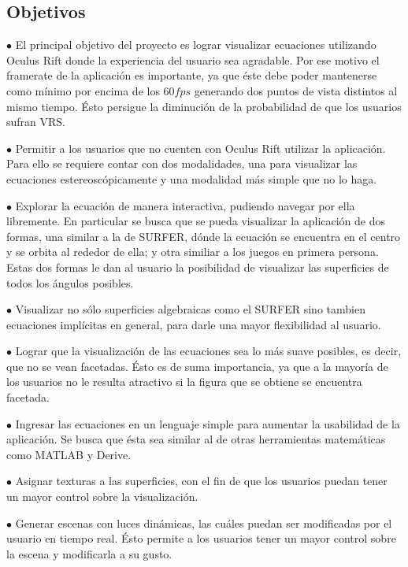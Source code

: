 \documentclass[12pt]{article}
\begin{document}
\subsection{Objetivos}
$\bullet$ El principal objetivo del proyecto es lograr visualizar ecuaciones utilizando Oculus Rift donde  la experiencia del usuario sea agradable. Por ese motivo el framerate de la aplicación es importante, ya que éste debe poder mantenerse como mínimo por encima de los $60 fps$ generando dos puntos de vista distintos al mismo tiempo. Ésto persigue la diminución de la probabilidad de que los usuarios sufran VRS. 

$\bullet$ Permitir a los usuarios que no cuenten con Oculus Rift utilizar la aplicación. Para ello se requiere contar con dos modalidades, una para visualizar las ecuaciones estereoscópicamente y una modalidad más simple que no lo haga.

$\bullet$ Explorar la ecuación de manera interactiva, pudiendo navegar por ella libremente. En particular se busca que se pueda visualizar la aplicación de dos formas, una similar a la de SURFER, dónde la ecuación se encuentra en el centro y se orbita al rededor de ella; y otra similiar a los juegos en primera persona. Estas dos formas le dan al usuario la posibilidad de visualizar las superficies de todos los ángulos posibles.

$\bullet$ Visualizar no sólo superficies algebraicas como el SURFER sino tambien ecuaciones implícitas en general, para darle una mayor flexibilidad al usuario.

$\bullet$ Lograr que la visualización de las ecuaciones sea lo más suave posibles, es decir, que no se vean facetadas. Ésto es de suma importancia, ya que a la mayoría de los usuarios no le resulta atractivo si la figura que se obtiene se encuentra facetada.

$\bullet$ Ingresar las ecuaciones en un lenguaje simple para aumentar la usabilidad de la aplicación. Se busca que ésta sea similar al de otras herramientas matemáticas como MATLAB y Derive.

$\bullet$ Asignar texturas a las superficies, con el fin de que los usuarios puedan tener un mayor control sobre la visualización. 

$\bullet$ Generar escenas con luces dinámicas, las cuáles puedan ser modificadas por el usuario en tiempo real. Ésto permite a los usuarios tener un mayor control sobre la escena y modificarla a su gusto.
\end{document}
